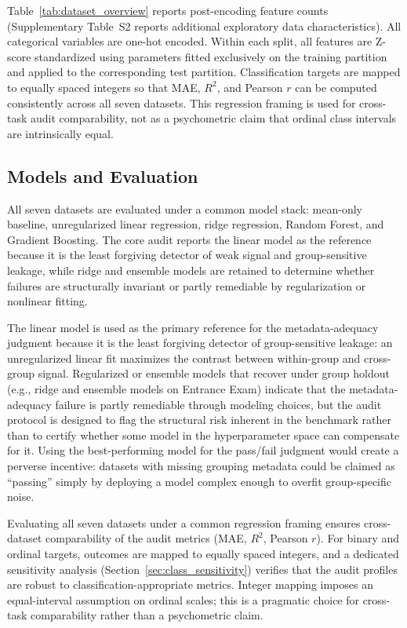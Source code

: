 \documentclass[10pt,letterpaper]{wlscirep}
\begin{document}
Table~\ref{tab:dataset_overview} reports post-encoding feature counts (Supplementary Table~S2 reports additional exploratory data characteristics). All categorical variables are one-hot encoded. Within each split, all features are Z-score standardized using parameters fitted exclusively on the training partition and applied to the corresponding test partition. Classification targets are mapped to equally spaced integers so that MAE, $R^2$, and Pearson $r$ can be computed consistently across all seven datasets. This regression framing is used for cross-task audit comparability, not as a psychometric claim that ordinal class intervals are intrinsically equal.

\subsection{Models and Evaluation}
\label{sec:models_eval}
All seven datasets are evaluated under a common model stack: mean-only baseline, unregularized linear regression, ridge regression, Random Forest, and Gradient Boosting. The core audit reports the linear model as the reference because it is the least forgiving detector of weak signal and group-sensitive leakage, while ridge and ensemble models are retained to determine whether failures are structurally invariant or partly remediable by regularization or nonlinear fitting.

The linear model is used as the primary reference for the metadata-adequacy judgment because it is the least forgiving detector of group-sensitive leakage: an unregularized linear fit maximizes the contrast between within-group and cross-group signal. Regularized or ensemble models that recover under group holdout (e.g., ridge and ensemble models on Entrance Exam) indicate that the metadata-adequacy failure is partly remediable through modeling choices, but the audit protocol is designed to flag the structural risk inherent in the benchmark rather than to certify whether some model in the hyperparameter space can compensate for it. Using the best-performing model for the pass/fail judgment would create a perverse incentive: datasets with missing grouping metadata could be claimed as ``passing'' simply by deploying a model complex enough to overfit group-specific noise.

Evaluating all seven datasets under a common regression framing ensures cross-dataset comparability of the audit metrics (MAE, $R^2$, Pearson $r$). For binary and ordinal targets, outcomes are mapped to equally spaced integers, and a dedicated sensitivity analysis (Section~\ref{sec:class_sensitivity}) verifies that the audit profiles are robust to classification-appropriate metrics. Integer mapping imposes an equal-interval assumption on ordinal scales; this is a pragmatic choice for cross-task comparability rather than a psychometric claim.
\end{document}
